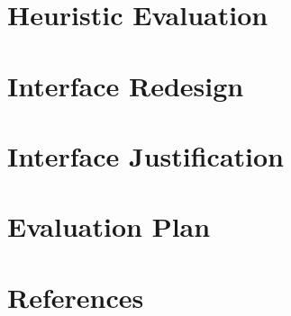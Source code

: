 \documentclass[
	letterpaper, %
]{jdf}
\begin{document}
\section{Heuristic Evaluation}

\section{Interface Redesign}

\section{Interface Justification}

\section{Evaluation Plan}


\section{References}

\printbibliography[heading=none]
\end{document}
